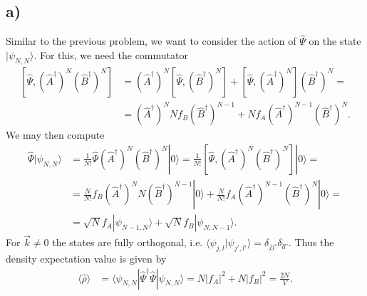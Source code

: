 \documentclass[english, parskip=full]{scrartcl}
\newcommand{\bra}{}
\newcommand{\brak}{}
\newcommand{\braket}{}
\newcommand{\kla}{}
\newcommand{\klam}{}
\newcommand{\Ket}{}
\begin{document}
\subsection*{a)}
Similar to the previous problem, we want to consider the action of $\hat{\Psi}$ on the state $\Ket | \psi_{N,N} \rangle$.
For this, we need the commutator
\begin{align}
\klam\left[ \hat{\Psi}, \kla\left( \hat{A}^\dagger \right)^N\kla\left( \hat{B}^\dagger \right)^N \right] &= \kla\left( \hat{A}^\dagger \right)^N \klam\left[ \hat{\Psi}, \kla\left( \hat{B}^\dagger \right)^N \right] + \klam\left[ \hat{\Psi}, \kla\left( \hat{A}^\dagger \right)^N \right] \kla\left( \hat{B}^\dagger \right)^N = \\
&= \kla\left( \hat{A}^\dagger \right)^N N f_B \kla\left( \hat{B}^\dagger \right)^{N-1} + N f_A \kla\left( \hat{A}^\dagger \right)^{N-1} \kla\left( \hat{B}^\dagger \right)^N.
\end{align}
We may then compute 
\begin{align}
\hat{\Psi} \Ket | \psi_{N,N} \rangle &= \frac{1}{N!} \hat{\Psi}  \kla\left( \hat{A}^\dagger \right)^N \kla\left( \hat{B}^\dagger \right)^N \Ket | 0 \rangle = \frac{1}{N!}\klam\left[ \hat{\Psi}, \kla\left( \hat{A}^\dagger \right)^N\kla\left( \hat{B}^\dagger \right)^N \right] \Ket | 0 \rangle = \\
&= \frac{N}{N!}f_B \kla\left( \hat{A}^\dagger \right)^N N \kla\left( \hat{B}^\dagger \right)^{N-1} \Ket | 0 \rangle + \frac{N}{N!} f_A \kla\left( \hat{A}^\dagger \right)^{N-1} \kla\left( \hat{B}^\dagger \right)^N\Ket | 0 \rangle  = \\
&= \sqrt{N}f_A\Ket | \psi_{N-1,N} \rangle + \sqrt{N}f_B \Ket | \psi_{N,N-1} \rangle.
\end{align}
For $\vec{k}\neq 0$ the states are fully orthogonal, i.e. $\brak\langle \psi_{j,l} | \psi_{j',l'} \rangle = \delta_{jj'}\delta_{ll'}$.
Thus the density expectation value is given by
\begin{align}
\bra\langle \hat{\rho} \rangle &= \braket\langle \psi_{N,N} | \hat{\Psi}^\dagger \hat{\Psi} | \psi_{N,N} \rangle = N |f_A|^2 + N|f_B|^2 = \frac{2N}{V}.
\end{align}
\end{document}

